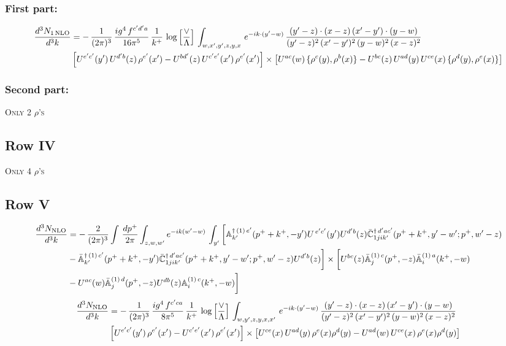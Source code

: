 \documentclass[9pt]{article}
\def\mf#1{\mathbb{#1}}
\numberwithin{equation}{section}
\begin{document}
\subsubsection{First part:}
\begin{align}
     \frac{d^{3}N_{1\,\rm NLO}}{d^{3}k} & = -\,\frac{1}{(2\pi)^{3}}\, \frac{ig^{4}\,f^{c'd'a}}{16\pi^{5}}\, \frac{1}{k^{+}}\,\log{\left[\frac{\vee}{\Lambda}\right]}\, \int_{w,x',y',z,y,x}\, e^{-ik\cdot (y'-w)}\,\frac{(y'-z)\cdot (x-z)\,(x'-y')\cdot (y-w)}{(y'-z)^{2}\,(x'-y')^{2}\,(y-w)^{2}\,(x-z)^{2}}\notag \\ &  \left[U^{e'c'}(y')\,U^{d'b}(z)\,\rho^{e'}(x')-U^{bd'}(z)\,U^{c'e'}(x')\,\rho^{e'}(x')\right]\times  \left[U^{ac}(w)\, \{\rho^{c}(y),\rho^{b}(x)\}-U^{bc}(z)\,U^{ad}(y)\,U^{ce}(x)\,\{\rho^{d}(y),\rho^{e}(x)\}\right]
\end{align} 
\subsubsection{Second part:}
\textsc{Only 2 $\rho$'s}
\subsection{Row IV}
\textsc{Only 4 $\rho$'s}
\subsection{{\color{green}Row V}}
\begin{align}
 \frac{d^{3}N_{\rm NLO}}{d^{3}k} & =   -\,\frac{2}{(2\pi)^{3}} \int\, \frac{dp^{+}}{2\pi}\int_{z,w,w^{\prime}} e^{-ik(w^{\prime}-w)}\,\int_{y^{\prime}}\bigg[\mf{A}^{\dagger\, (1)\,e^{\prime}}_{k^{\prime}}(p^{+}+k^{+},-y^{\prime})U^{\, e^{\prime}c^{\prime}}(y^{\prime})U^{d^{\prime}b}(z) \Bar{\mf{C}}^{\dagger\, d^{\prime}ac^{\prime}}_{1jik^{\prime}}(p^{+}+k^{+},y^{\prime}-w^{\prime}; p^{+},w^{\prime}-z) \notag \\ & -\Bar{\mf{A}}^{\dagger\, (1)\,c^{\prime}}_{k^{\prime}}(p^{+}+k^{+},-y^{\prime}) \Bar{\mf{C}}^{\dagger\, d^{\prime}ac^{\prime}}_{1jik^{\prime}}(p^{+}+k^{+},y^{\prime}-w^{\prime}; p^{+},w^{\prime}-z)U^{d^{\prime}b}(z)\bigg] \times  \bigg[U^{bc}(z)\Bar{\mf{A}}^{(1)\, c}_{j}(p^{+},-z)\Bar{\mf{A}}^{(1)\, a}_{i}(k^{+},-w)\notag \\ & -U^{ac}(w) \Bar{\mf{A}}^{(1)\, d}_{j}(p^{+},-z)U^{db}(z) \mf{A}^{(1)\, c}_{i}(k^{+},- w)\bigg]\nonumber
\end{align}
\begin{align}
 \frac{d^{3}N_{\rm NLO}}{d^{3}k} & =    -\,\frac{1}{(2\pi)^{3}}\, \frac{ig^{4}\,f^{c'ca}}{8\pi^{5}}\, \frac{1}{k^{+}}\,\log{\left[\frac{\vee}{\Lambda}\right]}\, \int_{w,y',z,y,x,x'}\, e^{-ik\cdot (y'-w)}\,\frac{(y'-z)\cdot (x-z)\,(x'-y')\cdot (y-w)}{(y'-z)^{2}\,(x'-y')^{2}\,(y-w)^{2}\,(x-z)^{2}}\notag \\ & \left[U^{e'c'}(y')\,\rho^{e'}(x')-U^{c'e'}(x')\,\rho^{e'}(x')\right]\times  \left[U^{ce}(x)\,U^{ad}(y)\,\rho^{e}(x)\rho^{d}(y)-U^{ad}(w)\,U^{ce}(x)\,\rho^{e}(x)\rho^{d}(y)\right]
\end{align}
\end{document}
